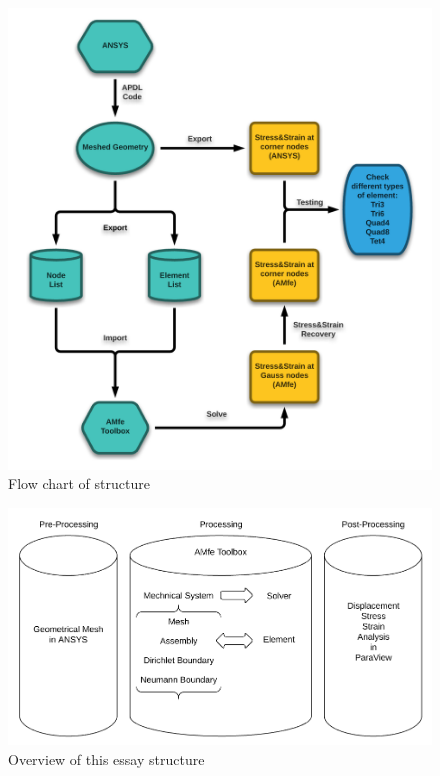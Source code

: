 \begin{figure}
	\begin{center}
		\includegraphics[width=12cm,clip]{Overview.pdf}			
		\caption{Flow chart of structure} \label{fig: Overview}
	\end{center}
\end{figure}

\begin{figure}
	\begin{center}
		\includegraphics[width=12cm,clip]{Overview2.pdf}			
		\caption{Overview of this essay structure} \label{fig: Overview2}
	\end{center}
\end{figure}

